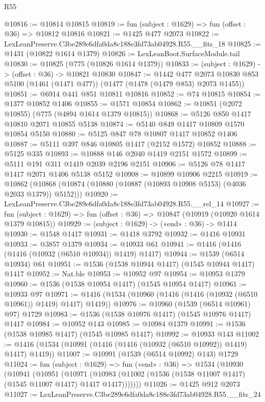 \begin{lexlean}{R55}
\begin{coremodule}
{{@10816 := @10814 @10815
@10819 := fun (subject : @1629) => fun (offset : @36) => @10812 @10816
@10821 := @1425 @477 @2073
@10822 := LexLeanPreserve.C3be289e6dfa0da8c188e3fd73ab04928.R55.__fits_18
@10825 := @1431 (@10822 @1614 @1379)
@10826 := LexLeanBoot.SurfaceModule.tail
@10830 := @10825 (@775 (@10826 @1614 @1379))
@10833 := (subject : @1629) -> (offset : @36) -> @10821 @10830
@10847 := @1442
    @477
    @2073
    @10830
    @853
    @5100
    (@1461 (@1471 @477))
    (@1477 (@1478 (@1479 @853) @2073 @1455))
@10851 := @6914 @441 @851 @10811 @10816
@10852 := @74 @10815
@10854 := @1377 @10852 @1406
@10855 := @1571 @10854
@10862 := @10851 (@2072 @10855) (@775 (@4894 @1614 @1379 @10815))
@10868 := @5126 @850 @1417 @10810 @2071 @10855 @5138
@10874 := @5140 @849 @1417 @10809 @1570 @10854 @5150
@10880 := @5125 @847 @78 @10807 @1417 @10852 @1406
@10887 := @5111 @397 @846 @10805 @1417 (@2152 @1572) @10852
@10888 := @5125 @335
@10893 := @10888 @146 @2040 @1419 @2151 @1572
@10899 := @5111 @191 @311 @1419 @2039 @2196 @2151
@10906 := @5126 @78 @1417 @1417 @2071 @1406 @5138 @5152
@10908 := @10899 @10906 @2215
@10919 := @10862 (@10868 (@10874 (@10880 (@10887 (@10893 @10908 @5153) (@4036 @2033 @1379)) @5152)))
@10920 := LexLeanPreserve.C3be289e6dfa0da8c188e3fd73ab04928.R55.__rel_14
@10927 := fun (subject : @1629) => fun (offset : @36) => @10847 (@10919 (@10920 @1614 @1379 @10815))
@10929 := (subject : @1629) -> («end» : @36) -> @1414
@10930 := @1548 @1417
@10931 := @1418 @3792
@10932 := @1416 @10931
@10933 := @3857 @1379
@10934 := @10933 @61
@10941 := @1416 (@1416 (@1416 (@10932 (@6510 @10934)) @1419) @1417)
@10944 := @1539 (@6514 @10934) @61
@10951 := @1536 (@1538 @10944 @1417) (@1545 @10944 @1417) @1417
@10952 := Nat.ble
@10953 := @10952 @97
@10954 := @10953 @1379
@10960 := @1536 (@1538 @10954 @1417) (@1545 @10954 @1417)
@10961 := @10933 @97
@10971 := @1416 (@1534 (@10960 (@1416 (@1416 (@10932 (@6510 @10961)) @1419) @1417) @1419))
@10976 := @10960 (@1539 (@6514 @10961) @97) @1729
@10983 := @1536 (@1538 @10976 @1417) (@1545 @10976 @1417) @1417
@10984 := @10952 @143
@10985 := @10984 @1379
@10991 := @1536 (@1538 @10985 @1417) (@1545 @10985 @1417)
@10992 := @10933 @143
@11002 := @1416 (@1534 (@10991 (@1416 (@1416 (@10932 (@6510 @10992)) @1419) @1417) @1419))
@11007 := @10991 (@1539 (@6514 @10992) @143) @1729
@11024 := fun (subject : @1629) =>
  fun («end» : @36) =>
  @1534
    (@10930
      (@10941
        (@10951
          (@10971
            (@10983 (@11002 (@1536 (@1538 @11007 @1417) (@1545 @11007 @1417) @1417 @1417)))))))
@11026 := @1425 @912 @2073
@11027 := LexLeanPreserve.C3be289e6dfa0da8c188e3fd73ab04928.R55.__fits_24
}}
\end{coremodule}
\end{lexlean}
